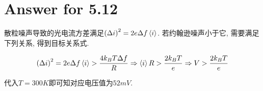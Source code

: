 \documentclass[twoside]{article}
\begin{document}
\section*{Answer for 5.12}

散粒噪声导致的光电流方差满足$\left(\Delta i\right)^2 = 2e \Delta f \braket{i}$. 若约翰逊噪声小于它, 需要满足下列关系, 得到目标关系式.

$$\left(\Delta i\right)^2 = 2 e \Delta f \braket{i} > \frac{4 k_B T \Delta f}{R} \Rightarrow \braket{i} R > \frac{2k_B T}{e} \Rightarrow V > \frac{2k_B T}{e}$$

代入$T = 300K$即可知对应电压值为$52mV$.
\end{document}
